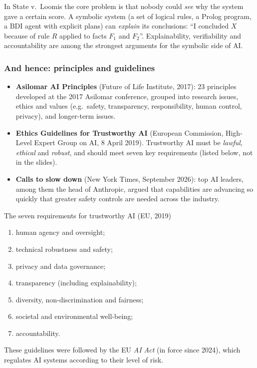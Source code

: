 \begin{nbintuition}
In State v.\ Loomis the core problem is that nobody could \emph{see} why the system gave a
certain score. A symbolic system (a set of logical rules, a Prolog program, a BDI agent
with explicit plans) can \emph{explain} its conclusions: ``I concluded $X$ because of rule
$R$ applied to facts $F_1$ and $F_2$''. Explainability, verifiability and accountability
are among the strongest arguments for the symbolic side of AI.
\end{nbintuition}

\subsubsection{And hence: principles and guidelines}

\begin{itemize}
  \item \textbf{Asilomar AI Principles} (Future of Life Institute, 2017): 23 principles
        developed at the 2017 Asilomar conference, grouped into research issues, ethics and
        values (e.g.\ safety, transparency, responsibility, human control, privacy), and
        longer-term issues.
  \item \textbf{Ethics Guidelines for Trustworthy AI} (European Commission, High-Level
        Expert Group on AI, 8 April 2019). Trustworthy AI must be \emph{lawful},
        \emph{ethical} and \emph{robust}, and should meet seven key requirements (listed
        below, not in the slides).
  \item \textbf{Calls to slow down} (New York Times, September 2026): top AI leaders, among
        them the head of Anthropic, argued that capabilities are advancing so quickly that
        greater safety controls are needed across the industry.
\end{itemize}

\begin{nbfact}{The seven requirements for trustworthy AI (EU, 2019)}
\notinslides
\begin{enumerate}[nosep]
  \item human agency and oversight;
  \item technical robustness and safety;
  \item privacy and data governance;
  \item transparency (including explainability);
  \item diversity, non-discrimination and fairness;
  \item societal and environmental well-being;
  \item accountability.
\end{enumerate}
These guidelines were followed by the EU \emph{AI Act} (in force since 2024), which
regulates AI systems according to their level of risk.
\end{nbfact}
